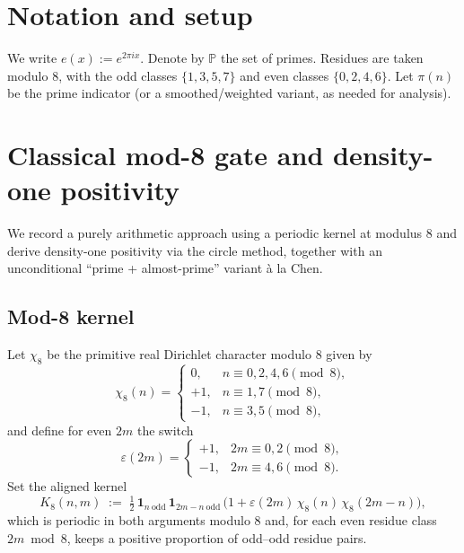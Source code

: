 \documentclass[11pt]{article}
\theoremstyle{definition}
\theoremstyle{remark}
\begin{document}
\section{Notation and setup}
We write $e(x):=e^{2\pi i x}$. Denote by $\mathbb{P}$ the set of primes. Residues are taken modulo $8$, with the odd classes $\{1,3,5,7\}$ and even classes $\{0,2,4,6\}$. Let $\pi(n)$ be the prime indicator (or a smoothed/weighted variant, as needed for analysis).


%

\section{Classical mod-8 gate and density-one positivity}\label{sec:mod8}
We record a purely arithmetic approach using a periodic kernel at modulus $8$ and derive density-one positivity via the circle method, together with an unconditional “prime + almost-prime” variant à la Chen.

\subsection*{Mod-8 kernel}
Let $\chi_8$ be the primitive real Dirichlet character modulo $8$ given by
\[
\chi_8(n)=\begin{cases}
0,& n\equiv 0,2,4,6\pmod 8,\\
{+}1,& n\equiv 1,7\pmod 8,\\
{-}1,& n\equiv 3,5\pmod 8,\end{cases}
\]
and define for even $2m$ the switch
\[
\varepsilon(2m)=\begin{cases}
{+}1,& 2m\equiv 0,2\pmod 8,\\
{-}1,& 2m\equiv 4,6\pmod 8.
\end{cases}
\]
Set the aligned kernel
\begin{equation}\label{eq:K8}
K_8(n,m)\;:=\;\tfrac12\,\mathbf 1_{n\ \mathrm{odd}}\,\mathbf 1_{2m-n\ \mathrm{odd}}\,\Big(1+\varepsilon(2m)\,\chi_8(n)\,\chi_8(2m-n)\Big),
\end{equation}
which is periodic in both arguments modulo $8$ and, for each even residue class $2m\bmod 8$, keeps a positive proportion of odd–odd residue pairs.
\end{document}
